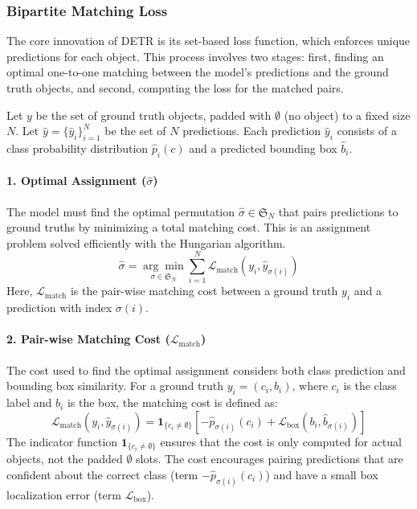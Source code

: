 \documentclass[10pt, conference]{IEEEtran}
\begin{document}
\subsubsection{Bipartite Matching Loss}
The core innovation of DETR is its set-based loss function, which enforces unique predictions for each object. This process involves two stages: first, finding an optimal one-to-one matching between the model's predictions and the ground truth objects, and second, computing the loss for the matched pairs.

Let $y$ be the set of ground truth objects, padded with $\emptyset$ (no object) to a fixed size $N$. Let $\hat{y} = \{\hat{y}_i\}_{i=1}^N$ be the set of $N$ predictions. Each prediction $\hat{y}_i$ consists of a class probability distribution $\hat{p}_i(c)$ and a predicted bounding box $\hat{b}_i$.

\paragraph{1. Optimal Assignment ($\hat{\sigma}$)}
The model must find the optimal permutation $\hat{\sigma} \in \mathfrak{S}_N$ that pairs predictions to ground truths by minimizing a total matching cost. This is an assignment problem solved efficiently with the Hungarian algorithm.
\begin{equation}
\hat{\sigma} = \underset{\sigma \in \mathfrak{S}_N}{\arg\min} \sum_{i=1}^{N} \mathcal{L}_{\text{match}}(y_i, \hat{y}_{\sigma(i)})
\label{eq:sigma_hat}
\end{equation}
Here, $\mathcal{L}_{\text{match}}$ is the pair-wise matching cost between a ground truth $y_i$ and a prediction with index $\sigma(i)$.

\paragraph{2. Pair-wise Matching Cost ($\mathcal{L}_{\text{match}}$)}
The cost used to find the optimal assignment considers both class prediction and bounding box similarity. For a ground truth $y_i=(c_i, b_i)$, where $c_i$ is the class label and $b_i$ is the box, the matching cost is defined as:
\begin{equation}
\mathcal{L}_{\text{match}}(y_i, \hat{y}_{\sigma(i)}) = \mathbf{1}_{\{c_i \neq \emptyset\}} \left[ -\hat{p}_{\sigma(i)}(c_i) + \mathcal{L}_{\text{box}}(b_i, \hat{b}_{\sigma(i)}) \right]
\label{eq:l_match}
\end{equation}
The indicator function $\mathbf{1}_{\{c_i \neq \emptyset\}}$ ensures that the cost is only computed for actual objects, not the padded $\emptyset$ slots. The cost encourages pairing predictions that are confident about the correct class (term $-\hat{p}_{\sigma(i)}(c_i)$) and have a small box localization error (term $\mathcal{L}_{\text{box}}$).
\end{document}
